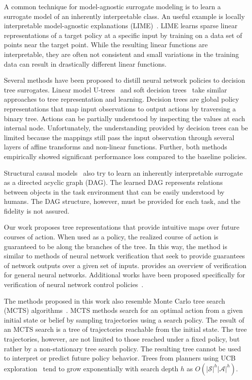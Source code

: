 \documentclass[letterpaper]{article} %
\begin{document}
A common technique for model-agnostic surrogate modeling is to learn a surrogate model of an inherently interpretable class. 
An useful example is locally interpretable model-agnostic explanations (LIME)~\cite{ribeiro2016}.
LIME learns sparse linear representations of a target policy at a specific input by training on a data set of points near the target point.
While the resulting linear functions are interpretable, they are often not consistent and small variations in the training data can result in drastically different linear functions.

Several methods have been proposed to distill neural network policies to decision tree surrogates.
Linear model U-trees~\cite{liu2018} and soft decision trees~\cite{coppens2019} take similar approaches to tree representation and learning.
Decision trees are global policy representations that map input observations to output actions by traversing a binary tree. 
Actions can be partially understood by inspecting the values at each internal node. 
Unfortunately, the understanding provided by decision trees can be limited because the mappings still pass the input observation through several layers of affine transforms and non-linear functions. 
Further, both methods empirically showed significant performance loss compared to the baseline policies.

Structural causal models~\cite{madumal2020} also try to learn an inherently interpretable surrogate as a directed acyclic graph (DAG). 
The learned DAG represents relations between objects in the task environment that can be easily understood by humans. 
The DAG structure, however, must be provided for each task, and the fidelity is not assured. 

Our work proposes tree representations that provide intuitive maps over future courses of action. 
When used as a policy, the realized course of action is guaranteed to be along the branches of the tree. 
In this way, the method is similar to methods of neural network verification that seek to provide guarantees of network outputs over a given set of inputs.
\citet{liu2021} provides an overview of verification for general neural networks. 
Additional works have been proposed specifically for verification of neural network control policies~\cite{sidrane2021}.

The methods proposed in this work also resemble Monte Carlo tree search (MCTS) algorithms~\cite{kocsis2006}. 
MCTS methods search for an optimal action from a given initial state or belief by sampling trajectories using a search policy. 
The result of an MCTS search is a tree of trajectories reachable from the initial state. 
The tree trajectories, however, are not limited to those reached under a fixed policy, but rather by a non-stationary tree search policy. 
The resulting tree cannot be used to interpret or predict future policy behavior. 
Trees from planners using UCB exploration~\cite{auer2002} tend to grow exponentially with search depth $h$ as $O(|\mathcal{S}|^h|\mathcal{A}|^h)$. %
\end{document}
